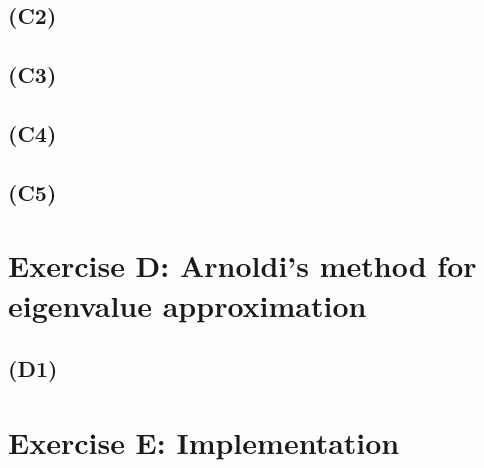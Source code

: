 \documentclass{article}
\begin{document}
\subsection*{(C2)}
\subsection*{(C3)}
\subsection*{(C4)}
\subsection*{(C5)}

\section{Exercise D: Arnoldi’s method for eigenvalue approximation}
\subsection*{(D1)}

\section{Exercise E: Implementation}
\end{document}
